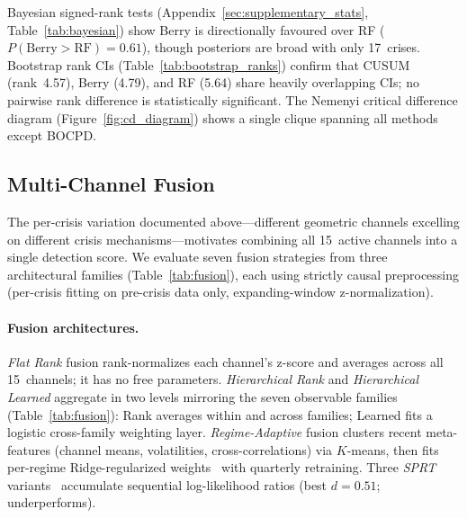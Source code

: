 \documentclass[3p]{elsarticle}
\begin{document}
Bayesian signed-rank tests (Appendix~\ref{sec:supplementary_stats},
Table~\ref{tab:bayesian}) show Berry is directionally favoured over RF
($P(\text{Berry} > \text{RF}) = 0.61$), though posteriors are broad
with only 17~crises.  Bootstrap rank CIs
(Table~\ref{tab:bootstrap_ranks}) confirm that CUSUM (rank~4.57),
Berry (4.79), and RF (5.64) share heavily overlapping CIs; no
pairwise rank difference is statistically significant.  The Nemenyi
critical difference diagram (Figure~\ref{fig:cd_diagram}) shows a
single clique spanning all methods except BOCPD.

\subsection{Multi-Channel Fusion}\label{subsec:causal_fusion}

The per-crisis variation documented above---different geometric channels
excelling on different crisis mechanisms---motivates combining all
15~active channels into a single detection score.  We evaluate seven
fusion strategies from three architectural families
(Table~\ref{tab:fusion}), each using strictly causal preprocessing
(per-crisis fitting on pre-crisis data only, expanding-window
z-normalization).

\paragraph{Fusion architectures.}
\emph{Flat Rank} fusion rank-normalizes each channel's z-score and
averages across all 15~channels; it has no free parameters.
\emph{Hierarchical Rank} and \emph{Hierarchical Learned} aggregate in
two levels mirroring the seven observable families
(Table~\ref{tab:fusion}): Rank averages within and across families;
Learned fits a logistic cross-family weighting layer.
\emph{Regime-Adaptive} fusion clusters recent meta-features (channel
means, volatilities, cross-correlations) via $K$-means, then fits
per-regime Ridge-regularized
weights~\cite{bates_granger1969,hoerl_kennard1970} with quarterly
retraining.  Three \emph{SPRT} variants~\cite{wald1947} accumulate sequential
log-likelihood ratios (best $d = 0.51$; underperforms).

\begin{table}[htb]
\centering
\caption{Multi-channel fusion across 15~crises (2007--2024).  Top
  5~individual channels and all 7~fusion methods.  Bootstrap
  $n = 10{,}000$.  Friedman $\chi^2 = 7.96$, $p = 0.54$ (no method
  dominates).}
\label{tab:fusion}
\small

\end{table}
\end{document}
